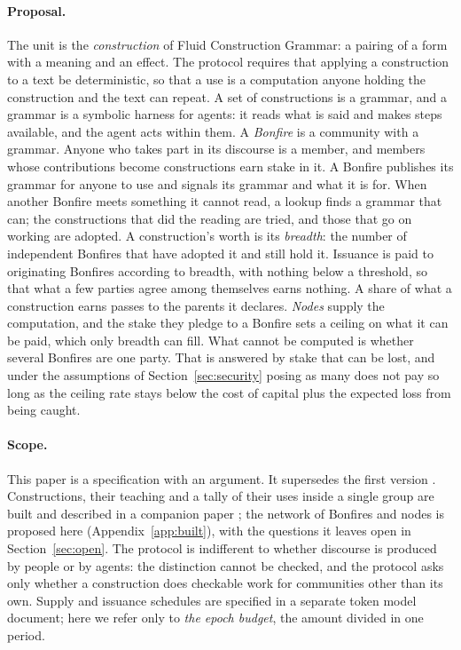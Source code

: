 \paragraph{Proposal.} The unit is the \emph{construction} of Fluid Construction Grammar: a pairing of a form with a
meaning and an effect. The protocol requires that applying a construction to a text be deterministic, so that a
use is a computation anyone holding the construction and the text can repeat. A set of constructions is a grammar,
and a grammar is a symbolic harness for agents: it reads what is said and makes steps available, and the agent
acts within them. A \emph{Bonfire} is a community with a grammar. Anyone who takes part in its discourse is a
member, and members whose contributions become constructions earn stake in it. A Bonfire publishes its grammar for
anyone to use and signals its grammar and what it is for. When another Bonfire meets something it cannot read, a
lookup finds a grammar that can; the constructions that did the reading are tried, and those that go on working
are adopted. A construction's worth is its \emph{breadth}: the number of independent Bonfires that have adopted it
and still hold it. Issuance is paid to originating Bonfires according to breadth, with nothing below a threshold,
so that what a few parties agree among themselves earns nothing. A share of what a construction earns passes to
the parents it declares. \emph{Nodes} supply the computation, and the stake they pledge to a Bonfire sets a ceiling
on what it can be paid, which only breadth can fill. What cannot be computed is whether several Bonfires are one
party. That is answered by stake that can be lost, and under the assumptions of Section~\ref{sec:security} posing as
many does not pay so long as the ceiling rate
stays below the cost of capital plus the expected loss from being caught.

\paragraph{Scope.} This paper is a specification with an argument. It supersedes the first version
\citep{cortes2025value}. Constructions, their teaching and a tally of their uses inside a single group are built and
described in a companion paper \citep{vera2026constructions}; the network of Bonfires and nodes is proposed here
(Appendix~\ref{app:built}), with the questions it leaves open in Section~\ref{sec:open}. The protocol is
indifferent to whether discourse is produced by people or by agents: the distinction cannot be checked, and the
protocol asks only whether a construction does checkable work for communities other than its own. Supply and
issuance schedules are specified in a separate token model document; here we refer only to \emph{the epoch
budget}, the amount divided in one period.

